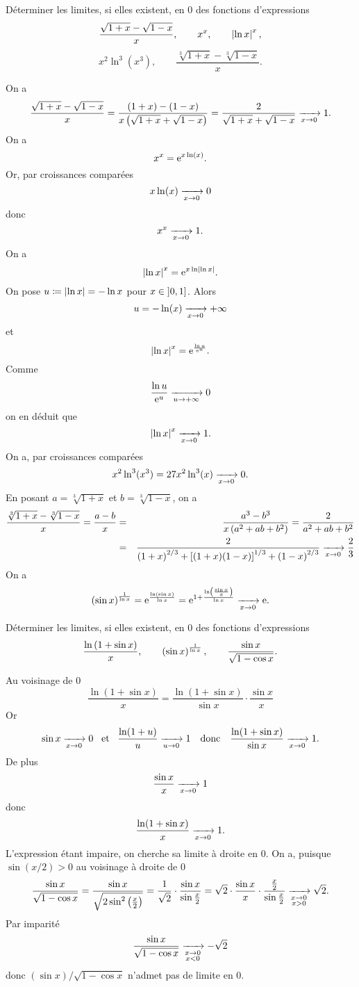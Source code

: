 \documentclass{magnolia}
\begin{document}
Déterminer les limites, si elles existent, en $0$ des fonctions
d'expressions
\[\frac{\sqrt{1+x}-\sqrt{1-x}}{x}, \qquad
  x^x, \qquad \left|\ln x\right|^x,\]
\[x^2 \ln^3(x^3), \qquad \frac{\sqrt[3]{1+x}-\sqrt[3]{1-x}}{x}.\]
\begin{sol}
\begin{questions}
\question On a
\[\frac{\sqrt{1+x}-\sqrt{1-x}}{x}=\frac{(1+x)-(1-x)}{x\left(\sqrt{1+x}+\sqrt{1-x}\right)}=\frac{2}{\sqrt{1+x}+\sqrt{1-x}}\xrightarrow[x\rightarrow 0]{}1.\]
\question On a
\[x^x={\rm e}^{x \ln(x)}.\]
Or, par croissances comparées
\[x\ln(x)\xrightarrow[x\rightarrow 0]{}0\]
donc
\[x^x\xrightarrow[x\rightarrow 0]{}1.\]
\question On a
\[\left|\ln x\right|^x={\rm e}^{x\ln\left|\ln x\right|}.\]
On pose $u\coloneqq \left|\ln x\right|=-\ln x$ pour $x\in\left]0,1\right]$. Alors
\[u=-\ln(x)\xrightarrow[x\rightarrow 0]{}+\infty\]
et
\[\left|\ln x\right|^x={\rm e}^{\frac{\ln u}{{\rm e}^ u}}.\]
Comme
\[\frac{\ln u}{{\rm e}^ u}\xrightarrow[u\rightarrow +\infty]{}0\]
on en déduit que
\[\left|\ln x\right|^x\xrightarrow[x\rightarrow 0]{}1.\]
\question On a, par croissances comparées
  \[x^2 \ln^3(x^3)=27 x^2\ln^3(x)\xrightarrow[x\rightarrow 0]{}0.\]
\question En posant $a=\sqrt[3]{1+x}$ et $b=\sqrt[3]{1-x}$, on a
\begin{eqnarray*}
 \frac{\sqrt[3]{1+x}-\sqrt[3]{1-x}}{x}=\frac{a-b}{x}
 &=&\frac{a^3-b^3}{x\left(a^2+ab+b^2\right)}=\frac{2}{a^2+ab+b^2}\\
 &=&\frac{2}{\left(1+x\right)^{2/3}+\left[(1+x)(1-x)\right]^{1/3}+\left(1-x\right)^{2/3}}\xrightarrow[x\rightarrow 0]{}\frac{2}{3}
 \end{eqnarray*}
\question On a
\[\left(\sin x\right)^{\frac{1}{\ln x}}={\rm e}^{\frac{\ln(\sin x)}{\ln x}}={\rm e}^{1+\frac{\ln\left(\frac{\sin x}{x}\right)}{\ln x}}\xrightarrow[x\rightarrow 0]{}{\rm e}.\]

\end{questions}
\end{sol}







Déterminer les limites, si elles existent, en $0$ des fonctions
d'expressions
\[\frac{\ln\left(1+\sin x\right)}{x}, \qquad \left(\sin x\right)^{\frac{1}{\ln x}},
  \qquad \frac{\sin x}{\sqrt{1-\cos x}}.\]
\begin{sol}
\begin{questions}
\question Au voisinage de 0
  \[\frac{\ln(1+\sin x)}{x}=\frac{\ln(1+\sin x)}{\sin x}\cdot\frac{\sin x}{x}\]
  Or
  \[\sin x\xrightarrow[x\rightarrow 0]{}0 \quad\!\text{et}\quad\! \frac{\ln(1+u)}{u}\xrightarrow[u\rightarrow 0]{}1 \quad\text{donc}\quad
    \frac{\ln(1+\sin x)}{\sin x}\xrightarrow[x\rightarrow 0]{}1.\]
  De plus
  \[\frac{\sin x}{x}\xrightarrow[x\rightarrow 0]{}1\]
  donc
  \[\frac{\ln(1+\sin x)}{x}\xrightarrow[x\rightarrow 0]{}1.\]
\question L'expression étant impaire, on cherche sa limite à droite en 0. On a, puisque $\sin(x/2)>0$ au voisinage à droite de 0
  \[\frac{\sin x}{\sqrt{1-\cos x}}=\frac{\sin x}{\sqrt{2\sin^2\left(\frac{x}{2}\right)}}=\frac{1}{\sqrt{2}}\cdot\frac{\sin x}{\sin \frac{x}{2}}=\sqrt{2}\cdot\frac{\sin x}{x}\cdot\frac{\frac{x}{2}}{\sin\frac{x}{2}}\xrightarrow[ \substack{x\rightarrow 0 \\ x>0}]{}\sqrt{2}.\]
  Par imparité
  \[\frac{\sin x}{\sqrt{1-\cos x}}\xrightarrow[ \substack{x\rightarrow 0 \\ x<0}]{}-\sqrt{2}\]
  donc $(\sin x)/\sqrt{1-\cos x}$ n'admet pas de limite en 0.
\end{questions}
\end{sol}
\end{document}
